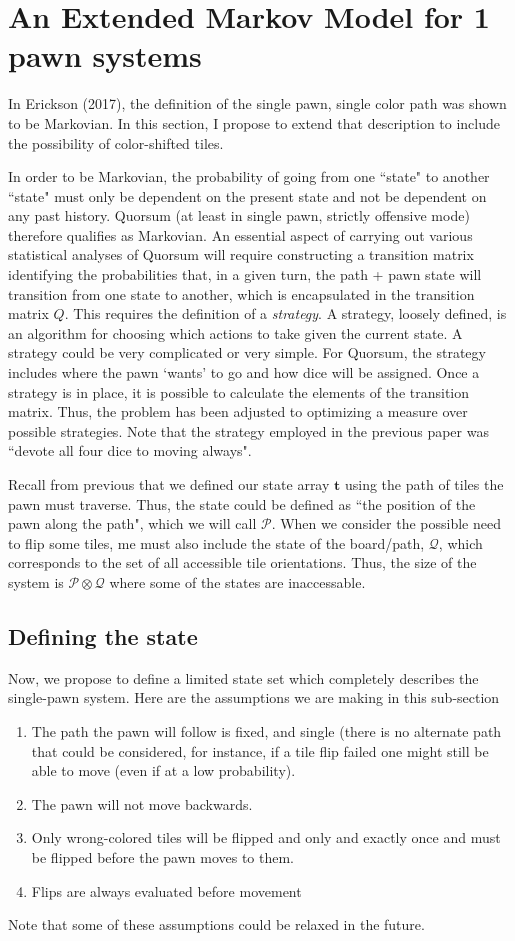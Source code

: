 \documentclass[letterpaper,11pt]{article}
\begin{document}
\section{An Extended Markov Model for 1 pawn systems}
In Erickson (2017), the definition of the single pawn, single color path was
shown to be Markovian.  In this section, I propose to extend that description
to include the possibility of color-shifted tiles.

In order to be Markovian, the probability of going from one ``state" to another
``state" must only be dependent on the present state and not be dependent on
any past history.  Quorsum (at least in single pawn, strictly offensive mode)
therefore qualifies as Markovian.  An essential aspect of carrying out various
statistical analyses of Quorsum will require constructing a transition matrix
identifying the probabilities that, in a given turn, the path + pawn state will
transition from one state to another, which is encapsulated in the transition
matrix $Q$.  This requires the definition of a \textit{strategy}.  A strategy,
loosely defined, is an algorithm for choosing which actions to take given the 
current state.  A strategy could be very complicated or very simple.  For
Quorsum, the strategy includes where the pawn `wants' to go and how dice will
be assigned.  Once a strategy is in place, it is possible to calculate the
elements of the transition matrix.  Thus, the problem has been adjusted to
optimizing a measure over possible strategies.  Note that the strategy
employed in the previous paper was ``devote all four dice to moving always".

Recall from previous that we defined our state array $\mathbf{t}$ using the path
of tiles the pawn must traverse.  Thus, the state could be defined as ``the
position of the pawn along the path", which we will call $\mathcal{P}$.  When
we consider the possible need to flip some tiles, me must also include the 
state of the board/path, $\mathcal{Q}$, which corresponds to the set of all 
accessible tile orientations.  Thus, the size of the system is $\mathcal{P}
\otimes \mathcal{Q}$ where some of the states are inaccessable.

\subsection{Defining the state}
Now, we propose to define a limited state set which completely describes the
single-pawn system.  Here are the assumptions we are making in this sub-section
\begin{enumerate}
	\item The path the pawn will follow is fixed, and single (there is no
		alternate path that could be considered, for instance, if a
		tile flip failed one might still be able to move (even if at
		a low probability).
	\item The pawn will not move backwards.
	\item Only wrong-colored tiles will be flipped and only and exactly
		once and must be flipped before the pawn moves to them.
	\item Flips are always evaluated before movement
\end{enumerate}
Note that some of these assumptions could be relaxed in
the future.  
\end{document}
